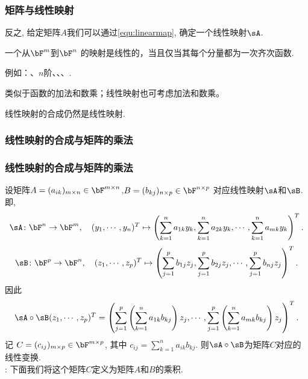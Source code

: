 \begin{frame}\frametitle{矩阵与线性映射}

反之, 给定矩阵$A$我们可以通过\eqref{equ:linearmap}, 确定一个线性映射$\sA$.
\pp
\begin{center}
\end{center}
\pp
{} 一个从$\bF^m$到$\bF^n$ 的映射是线性的，当且仅当其每个分量都为一次齐次函数.
\pp
\bigskip

\pp
例如：、$n$阶、、、.
\pp
\bigskip

类似于函数的加法和数乘；线性映射也可考虑加法和数乘。
\pp

\pp
\bigskip

\begin{lemma}
线性映射的合成仍然是线性映射.
\end{lemma}
\pp
{}
\end{frame}





\subsubsection{线性映射的合成与矩阵的乘法}
\begin{frame}\frametitle{线性映射的合成与矩阵的乘法}
设矩阵$A=(a_{ik})_{m\times n}\in \bF^{m\times n}$,$B=(b_{kj})_{n\times p}\in \bF^{n\times p}$ 对应线性映射$\sA$和$\sB$. \pp 即,
{\small\[\sA\colon \bF^n \rightarrow \bF^m, \quad (y_1,\cdots,y_n)^T \mapsto \left(\sum_{k=1}^{n} a_{1k}y_k,\sum_{k=1}^{n} a_{2k}y_k,\cdots,\sum_{k=1}^{n} a_{mk}y_k\right)^T.\]
\[\sB\colon \bF^p\rightarrow \bF^n, \quad (z_1,\cdots,z_p)^T \mapsto \left(\sum_{j=1}^{p} b_{1j}z_j,\sum_{j=1}^{p} b_{2j}z_j,\cdots,\sum_{j=1}^{p} b_{nj}z_j\right)^T.\]}
\pp
因此
\[\sA\circ \sB(z_1,\cdots,z_p)^T = \left(\sum\limits_{j=1}^{p}\left(\sum\limits_{k=1}^{n}a_{1k}b_{kj}\right)z_j,\cdots,\sum\limits_{j=1}^{p}\left(\sum\limits_{k=1}^{n}a_{mk}b_{kj}\right)z_j\right)^T.\]
\pp 记 $C=(c_{ij})_{m\times p}\in \bF^{m\times p}$, 其中 $c_{ij}=\sum_{k=1}^{n}a_{ik}b_{kj}$. 则$\sA\circ \sB$为矩阵$C$对应的线性变换.\\ \pp
{}: 下面我们将这个矩阵$C$定义为矩阵$A$和$B$的乘积.
\end{frame}





